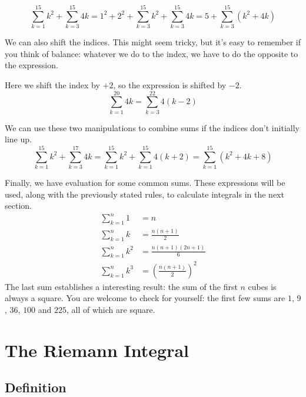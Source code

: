 \documentclass[fleqn]{report}
\begin{document}
\begin{example}
\begin{equation*}
\sum_{k=1}^{15} k^2 + \sum_{k=3}^{15} 4k =
1^2 + 2^2 + \sum_{k=3}^{15} k^2 + \sum_{k=3}^{15} 4k 
= 5 + \sum_{k=3}^{15} (k^2 + 4k)
\end{equation*}
\end{example}

We can also shift the indices. This might seem tricky, but
it's easy to remember if you think of balance: whatever we do
to the index, we have to do the opposite to the expression.

\begin{example} Here we shift the index by $+2$, so the
expression is shifted by $-2$.
\begin{equation*}
\sum_{k=1}^{20} 4k = \sum_{k=3}^{22} 4(k-2)
\end{equation*}
\end{example}

\begin{example}
We can use these two manipulations to combine sums if the
indices don't initially line up.
\begin{equation*}
\sum_{k=1}^{15} k^2 + \sum_{k=3}^{17} 4k 
= \sum_{k=1}^{15} k^2 + \sum_{k=1}^{15} 4(k+2) 
= \sum_{k=1}^{15} (k^2 + 4k + 8)
\end{equation*}
\end{example}

Finally, we have evaluation for some common sums.
These expressions will be used, along with the previously
stated rules, to calculate integrals in the next section.
\begin{align*}
\sum_{k=1}^n 1 & = n \\
\sum_{k=1}^n k & = \frac{n(n+1)}{2} \\
\sum_{k=1}^n k^2 & = \frac{n(n+1)(2n+1)}{6} \\
\sum_{k=1}^n k^3 & = \left(\frac{n(n+1)}{2} \right)^2 
\end{align*}
The last sum establishes a interesting result: the sum of the
first $n$ cubes is always a square. You are welcome to check
for yourself: the first few sums are $1$, $9$, $36$, $100$ and
$225$, all of which are square. 

\section{The Riemann Integral}
\label{riemann-integral}

\subsection{Definition}
\label{integral-definition}
\end{document}
